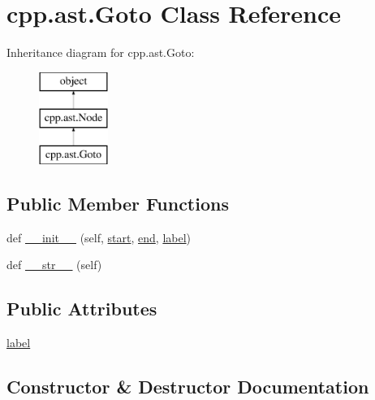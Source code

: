 \hypertarget{classcpp_1_1ast_1_1_goto}{}\section{cpp.\+ast.\+Goto Class Reference}
\label{classcpp_1_1ast_1_1_goto}
Inheritance diagram for cpp.\+ast.\+Goto\+:\begin{figure}[H]
\begin{center}
\leavevmode
\includegraphics[height=3.000000cm]{df/d6d/classcpp_1_1ast_1_1_goto}
\end{center}
\end{figure}
\subsection*{Public Member Functions}
\begin{DoxyCompactItemize}
\item 
def \mbox{\hyperlink{classcpp_1_1ast_1_1_goto_a928e79374a90d01fc060985ea1e45260}{\+\_\+\+\_\+init\+\_\+\+\_\+}} (self, \mbox{\hyperlink{classcpp_1_1ast_1_1_node_a7b2aa97e6a049bb1a93aea48c48f1f44}{start}}, \mbox{\hyperlink{classcpp_1_1ast_1_1_node_a3c5e5246ccf619df28eca02e29d69647}{end}}, \mbox{\hyperlink{classcpp_1_1ast_1_1_goto_a685284ea5f3b21f39aff7f5db841c8f5}{label}})
\item 
def \mbox{\hyperlink{classcpp_1_1ast_1_1_goto_a508b6bc091cf06bfed73a33368c236c9}{\+\_\+\+\_\+str\+\_\+\+\_\+}} (self)
\end{DoxyCompactItemize}
\subsection*{Public Attributes}
\begin{DoxyCompactItemize}
\item 
\mbox{\hyperlink{classcpp_1_1ast_1_1_goto_a685284ea5f3b21f39aff7f5db841c8f5}{label}}
\end{DoxyCompactItemize}


\subsection{Constructor \& Destructor Documentation}
\mbox{\label{classcpp_1_1ast_1_1_goto_a928e79374a90d01fc060985ea1e45260}} 

